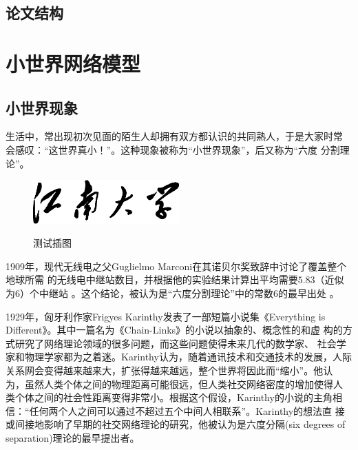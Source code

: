\section{论文结构}
\Blindtext

\chapter{小世界网络模型}\label{chapter_smallworld}
\section{小世界现象}

生活中，常出现初次见面的陌生人却拥有双方都认识的共同熟人，于是大家时常
会感叹：“这世界真小！”。这种现象被称为``小世界现象''，后又称为``六度
分割理论''。

\begin{figure}[htbp]
  \centering
  \includegraphics[width= 0.5\textwidth]{jnuname.eps}\\
  \caption{测试插图}\label{fig:test2}
\end{figure}

1909年，现代无线电之父Guglielmo Marconi在其诺贝尔奖致辞中讨论了覆盖整个地球所需
的无线电中继站数目，并根据他的实验结果计算出平均需要$5.83$（近似为$6$）个中继站
\cite{marconi1909nobel}。这个结论，被认为是``六度分割理论''中的常数$6$的最早出处
\cite{barabasi2003linked}。

1929年，匈牙利作家Frigyes Karinthy发表了一部短篇小说集《Everything is
  Different》。其中一篇名为《Chain-Links》的小说以抽象的、概念性的和虚
构的方式研究了网络理论领域的很多问题，而这些问题使得未来几代的数学家、
社会学家和物理学家都为之着迷\cite{newman2006structure,
  barabasi2003linked}。Karinthy认为，随着通讯技术和交通技术的发展，人际
关系网会变得越来越来大，扩张得越来越远，整个世界将因此而``缩小''。他认
为，虽然人类个体之间的物理距离可能很远，但人类社交网络密度的增加使得人
类个体之间的社会性距离变得非常小。根据这个假设，Karinthy的小说的主角相
信：``任何两个人之间可以通过不超过五个中间人相联系''。Karinthy的想法直
接或间接地影响了早期的社交网络理论的研究，他被认为是六度分隔(six
degrees of separation)理论的最早提出者\cite{barabasi2003linked}。


